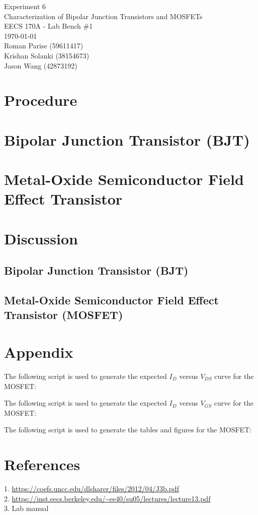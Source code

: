 \documentclass{article}
\begin{document}
	\begin{titlepage}
		\centering
		\Huge{Experiment 6} \\
		\huge{Characterization of Bipolar Junction Transistors and MOSFETs} \\
		\vspace{1cm}
		\large{EECS 170A - Lab Bench \#1} \\
		\large{\today} \\
		\vspace{1cm}
		\normalsize{Roman Parise (59611417)} \\
		\normalsize{Krishan Solanki (38154673)} \\
		\normalsize{Jason Wang (42873192)} \\
	\end{titlepage}
\section{Procedure}

\section{Bipolar Junction Transistor (BJT)}

\section{Metal-Oxide Semiconductor Field Effect Transistor}

\section{Discussion}
\subsection{Bipolar Junction Transistor (BJT)}

\subsection{Metal-Oxide Semiconductor Field Effect Transistor (MOSFET)}

\section{Appendix}
The following script is used to generate the expected $I_D$ versus $V_{DS}$ curve for the MOSFET:

The following script is used to generate the expected $I_D$ versus $V_{GS}$ curve for the MOSFET:

The following script is used to generate the tables and figures for the MOSFET:

\section{References}
1. \url{https://coefs.uncc.edu/dlsharer/files/2012/04/J3b.pdf} \\
2. \url{https://inst.eecs.berkeley.edu/~ee40/su05/lectures/lecture13.pdf} \\
3. Lab manual \\
\end{document}
